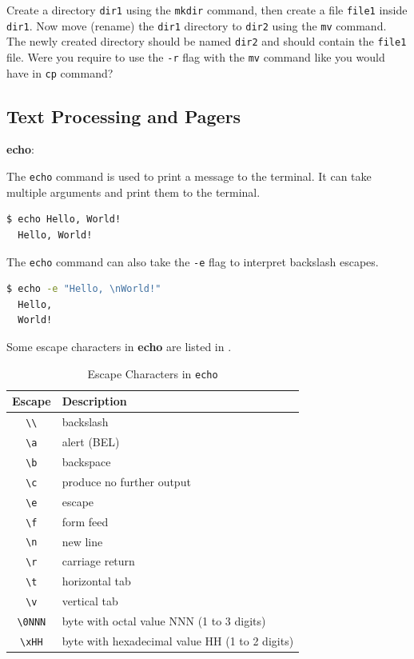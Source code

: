 \begin{exercise}
  Create a directory \texttt{dir1} using the \texttt{mkdir} command, then create a file \texttt{file1} inside \texttt{dir1}.
  Now move (rename) the \texttt{dir1} directory to \texttt{dir2} using the \texttt{mv} command.
  The newly created directory should be named \texttt{dir2} and should contain the \texttt{file1} file.
  Were you require to use the \texttt{-r} flag with the \texttt{mv} command like you would have in \texttt{cp} command?
\end{exercise}

\subsection{Text Processing and Pagers}

\textbf{echo}:

The \texttt{echo} command is used to print a message to the terminal.
It can take multiple arguments and print them to the terminal.

\begin{lstlisting}[language=bash]
  $ echo Hello, World!
  Hello, World!
\end{lstlisting}

The \texttt{echo} command can also take the \texttt{-e} flag to interpret backslash escapes.

\begin{lstlisting}[language=bash]
  $ echo -e "Hello, \nWorld!"
  Hello,
  World!
\end{lstlisting}

Some escape characters in \textbf{echo} are listed in .

\begin{table}[h!]
\caption{Escape Characters in \texttt{echo}}
\begin{tabular}{ c l }
  \toprule
 Escape & Description \\
 \midrule
  \texttt{\textbackslash\textbackslash} & backslash \\
  \texttt{\textbackslash a} & alert (BEL) \\
  \texttt{\textbackslash b} & backspace \\
  \texttt{\textbackslash c} & produce no further output \\
  \texttt{\textbackslash e} & escape \\
  \texttt{\textbackslash f} & form feed \\
  \texttt{\textbackslash n} & new line \\
  \texttt{\textbackslash r} & carriage return \\
  \texttt{\textbackslash t} & horizontal tab \\
  \texttt{\textbackslash v} & vertical tab \\
  \texttt{\textbackslash 0NNN} & byte with octal value NNN (1 to 3 digits) \\
  \texttt{\textbackslash xHH} & byte with hexadecimal value HH (1 to 2 digits) \\
  \bottomrule
\end{tabular}
\end{table}

